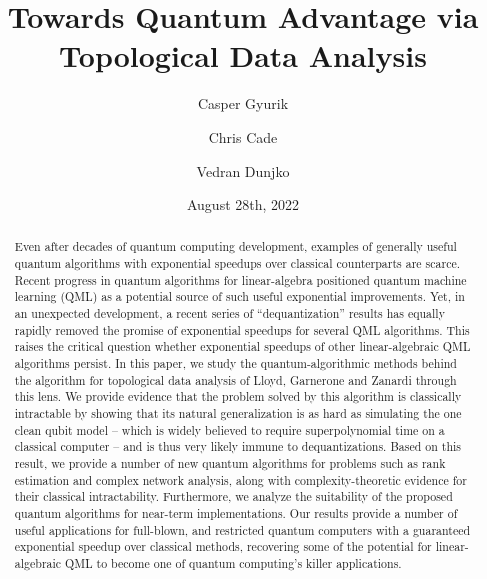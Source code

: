 \documentclass[a4paper, onecolumn, accepted=2022-08-28]{quantumarticle}
\begin{document}
\title{Towards Quantum Advantage via Topological Data Analysis}

\author{Casper Gyurik}

\author{Chris Cade}

\author{Vedran Dunjko}

\date{August 28th, 2022}

\begin{abstract}
  Even after decades of quantum computing development, examples of generally useful quantum algorithms with exponential speedups over classical counterparts are scarce. 
  Recent progress in quantum algorithms for linear-algebra positioned quantum machine learning (QML) as a potential source of such useful exponential improvements.
  Yet, in an unexpected development, a recent series of ``dequantization'' results has equally rapidly removed the promise of exponential speedups for several QML algorithms.
  This raises the critical question whether exponential speedups of other linear-algebraic QML algorithms persist.
  In this paper, we study the quantum-algorithmic methods behind the algorithm for topological data analysis of Lloyd, Garnerone and Zanardi through this lens.
  We provide evidence that the problem solved by this algorithm is classically intractable by showing that its natural generalization is as hard as simulating the one clean qubit model -- 
  which is widely believed to require superpolynomial time on a classical computer --
  and is thus very likely immune to dequantizations.
  Based on this result, we provide a number of new quantum algorithms for problems such as rank estimation and complex network analysis, along with complexity-theoretic evidence for their classical intractability.
  Furthermore, we analyze the suitability of the proposed quantum algorithms for near-term implementations.
  Our results provide a number of useful applications for full-blown, and restricted quantum computers with a guaranteed exponential speedup over classical methods, recovering some of the potential for linear-algebraic QML to become one of quantum computing's killer applications.
\end{abstract}
\end{document}
